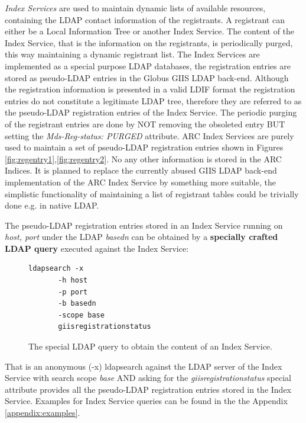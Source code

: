 \documentclass{article}
\begin{document}
 
{\it Index Services} are used to maintain dynamic
lists of available resources, containing the LDAP contact information of
the registrants. A registrant can either be a Local Information Tree or another 
Index Service. The content of the Index Service, that is the information on
the registrants, is periodically purged, this way maintaining a dynamic 
registrant list. The Index Services are implemented as a special purpose 
LDAP databases, the registration entries are stored as pseudo-LDAP entries 
in the Globus GIIS LDAP back-end. Although the registration 
information is presented in a valid LDIF format the registration entries
do not constitute a legitimate LDAP tree, therefore they are referred to as the
pseudo-LDAP registration entries of the Index Service.
The periodic purging of the 
registrant entries are done by NOT removing the obsoleted entry BUT
setting the {\it Mds-Reg-status: PURGED} attribute. 
ARC Index Services are purely used to maintain a set of pseudo-LDAP registration 
entries shown in Figures \ref{fig:regentry1},\ref{fig:regentry2}. No any other information
is stored in the ARC Indices.
It is planned to replace the currently abused GIIS LDAP back-end implementation 
of the ARC Index Service by something more suitable, the simplistic functionality 
of maintaining a list of registrant tables could be trivially done e.g. 
in native LDAP.

The pseudo-LDAP registration entries stored in an Index Service
running on {\it host, port} under the LDAP {\it basedn}  can be 
obtained by a \textbf{specially crafted LDAP query} executed against the Index Service:

\begin{figure}
\begin{verbatim}
ldapsearch -x
	   -h host 
	   -p port 	   
	   -b basedn 
	   -scope base
	   giisregistrationstatus 
\end{verbatim}
\caption{\label{fig:giisregistrationstatus} The special LDAP query to obtain the content
of an Index Service.}
\end{figure}

That is an anonymous (-x) ldapsearch against the LDAP server 
of the Index Service with search scope {\it base}  AND asking for the
{\it giisregistrationstatus} special attribute provides all the pseudo-LDAP 
registration entries stored in the Index Service.
Examples for Index Service queries can be found in the the Appendix
\ref{appendix:examples}. 
\end{document}
